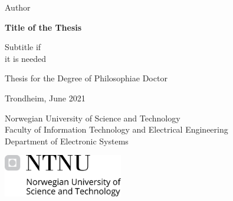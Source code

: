 

{\Large \noindent \color{Test3} Author} \newline

\vspace{1cm}

{\begin{flushleft}
\fontsize{21.8}{26.16} \selectfont \bfseries \noindent 
Title of the Thesis
\end{flushleft}}

\vspace{3mm}

{\LARGE \noindent Subtitle if \vspace{1.0mm}\\ 
it is needed \newline}

\vspace{5.7cm}

\noindent Thesis for the Degree of Philosophiae Doctor \newline 

\noindent Trondheim, June 2021 \newline

\noindent Norwegian University of Science and Technology \\
Faculty of Information Technology and Electrical Engineering \\
Department of Electronic Systems

\vspace{1.5cm}

\noindent \includegraphics[width=0.39\textwidth]{figures/ntnu-logo-bw.png}

\newpage


